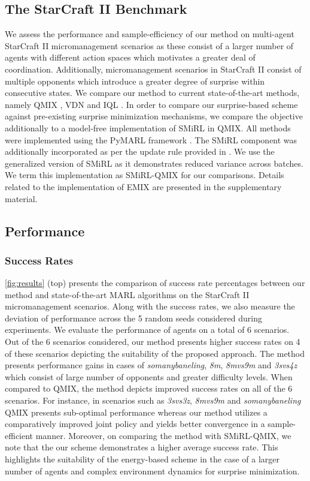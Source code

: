 \documentclass{article}
\begin{document}
\begin{multicols}{2}
\subsection{The StarCraft II Benchmark}
We assess the performance and sample-efficiency of our method on multi-agent StarCraft II micromanagement scenarios \cite{smac} as these consist of a larger number of agents with different action spaces which motivates a greater deal of coordination. Additionally, micromanagement scenarios in StarCraft II consist of multiple opponents which introduce a greater degree of surprise within consecutive states. We compare our method to current state-of-the-art methods, namely QMIX \cite{qmix}, VDN \cite{vdn} and IQL \cite{iql}. In order to compare our surprise-based scheme against pre-existing surprise minimization mechanisms, we compare the objective additionally to a model-free implementation of SMiRL \cite{smirl} in QMIX. All methods were implemented using the PyMARL framework \cite{smac}. The SMiRL component was additionally incorporated as per the update rule provided in \cite{gen}. We use the generalized version of SMiRL as it demonstrates reduced variance across batches. We term this implementation as SMiRL-QMIX for our comparisons. Details related to the implementation of EMIX are presented in the supplementary material.

\subsection{Performance}
\subsubsection{Success Rates}
\autoref{fig:results} (top) presents the comparison of success rate percentages between our method and state-of-the-art MARL algorithms on the StarCraft II micromanagement scenarios. Along with the success rates, we also measure the deviation of performance across the 5 random seeds considered during experiments. We evaluate the performance of agents on a total of 6 scenarios. Out of the 6 scenarios considered, our method presents higher success rates on 4 of these scenarios depicting the suitability of the proposed approach. The method presents performance gains in cases of \textit{so\textunderscore many\textunderscore baneling}, \textit{8m}, \textit{8m\textunderscore vs\textunderscore 9m} and \textit{3s\textunderscore vs\textunderscore 4z} which consist of large number of opponents and greater difficulty levels. When compared to QMIX, the method depicts improved success rates on all of the 6 scenarios. For instance, in scenarios such as \textit{3s\textunderscore vs\textunderscore 3z}, \textit{8m\textunderscore vs\textunderscore 9m} and \textit{so\textunderscore many\textunderscore baneling} QMIX presents sub-optimal performance whereas our method utilizes a comparatively improved joint policy and yields better convergence in a sample-efficient manner. Moreover, on comparing the method with SMiRL-QMIX, we note that the our scheme demonstrates a higher average success rate. This highlights the suitability of the energy-based scheme in the case of a larger number of agents and complex environment dynamics for surprise minimization.


\end{multicols}
\end{document}
